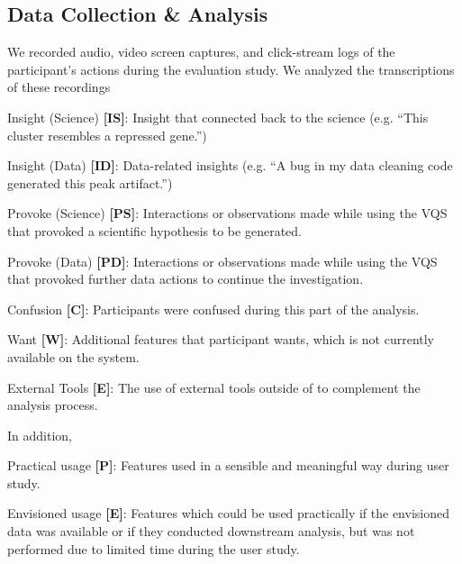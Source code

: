 \subsection{Data Collection \& Analysis}
We recorded audio, video screen captures, and click-stream logs of the participant's actions during the evaluation study. We analyzed the transcriptions of these recordings  
\begin{denselist}
    \item Insight (Science) \textbf{[IS]}: Insight that connected back to the science (e.g. ``This cluster resembles a repressed gene.'')
    \item Insight (Data) \textbf{[ID]}: Data-related insights (e.g. ``A bug in my data cleaning code generated this peak artifact.'')
    \item Provoke (Science) \textbf{[PS]}: Interactions or observations made while using the VQS that provoked a scientific hypothesis to be generated.
    \item Provoke (Data) \textbf{[PD]}: Interactions or observations made while using the VQS that provoked further data actions to continue the investigation.
    \item Confusion \textbf{[C]}: Participants were confused during this part of the analysis.
    \item Want \textbf{[W]}: Additional features that participant wants, which is not currently available on the system.
    \item External Tools \textbf{[E]}: The use of external tools outside of \zv to complement the analysis process.
\end{denselist}
\par In addition,  
\begin{denselist}
    \item Practical usage \textbf{[P]}: Features used in a sensible and meaningful way during user study.
    \item Envisioned usage \textbf{[E]}: Features which could be used practically if the envisioned data was available or if they conducted downstream analysis, but was not performed due to limited time during the user study. 
    \item {}
\end{denselist}

